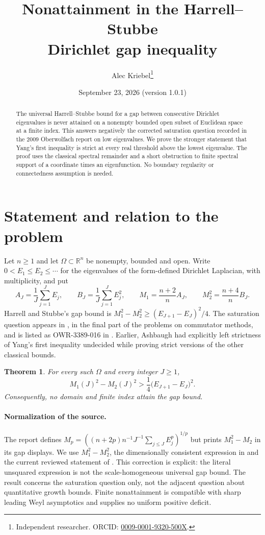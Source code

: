 \documentclass[10pt]{article}
\title{Nonattainment in the Harrell--Stubbe\protect\\ Dirichlet gap inequality}
\author{Alec Kriebel\thanks{Independent researcher. ORCID: \href{https://orcid.org/0009-0001-9320-500X}{0009-0001-9320-500X}.}}
\date{September 23, 2026 (version 1.0.1)}
\newtheorem{theorem}{Theorem}
\newcommand{\R}{\mathbb R}
\begin{document}
\maketitle
\begin{abstract}
The universal Harrell--Stubbe bound for a gap between consecutive Dirichlet eigenvalues is never attained on a nonempty bounded open subset of Euclidean space at a finite index. This answers negatively the corrected saturation question recorded in the 2009 Oberwolfach report on low eigenvalues. We prove the stronger statement that Yang's first inequality is strict at every real threshold above the lowest eigenvalue. The proof uses the classical spectral remainder and a short obstruction to finite spectral support of a coordinate times an eigenfunction. No boundary regularity or connectedness assumption is needed.
\end{abstract}

\section{Statement and relation to the problem}
Let $n\ge1$ and let $\Omega\subset\R^n$ be nonempty, bounded and open. Write
$0<E_1\le E_2\le\cdots$ for the eigenvalues of the form-defined Dirichlet Laplacian, with multiplicity, and put
\[
 A_J=\frac1J\sum_{j=1}^J E_j,\qquad
 B_J=\frac1J\sum_{j=1}^J E_j^2,\qquad
 M_1=\frac{n+2}{n}A_J,\qquad M_2^2=\frac{n+4}{n}B_J.
\]
Harrell and Stubbe's gap bound \cite[Proposition 6]{HS} is
$M_1^2-M_2^2\ge (E_{J+1}-E_J)^2/4$. The saturation question appears in \cite[p.~415]{OWR}, in the final part of the problems on commutator methods, and is listed as OWR-3389-016 in \cite{UM}. Earlier, Ashbaugh \cite[p.~12]{Ash02} had explicitly left strictness of Yang's first inequality undecided while proving strict versions of the other classical bounds.

\begin{theorem}\label{thm:gap}
For every such $\Omega$ and every integer $J\ge1$,
\begin{equation}\label{eq:gap}
 \boxed{\quad M_1(J)^2-M_2(J)^2>
 \frac14\bigl(E_{J+1}-E_J\bigr)^2.\quad}
\end{equation}
Consequently, no domain and finite index attain the gap bound.
\end{theorem}

\paragraph{Normalization of the source.}
The report \cite[p.~415]{OWR} defines
$M_p=((n+2p)n^{-1}J^{-1}\sum_{j\le J}E_j^p)^{1/p}$ but prints
$M_1^2-M_2$ in its gap displays. We use $M_1^2-M_2^2$, the dimensionally consistent expression in \cite[Proposition 6]{HS} and the current reviewed statement of \cite{UM}. This correction is explicit: the literal unsquared expression is not the scale-homogeneous universal gap bound. The result concerns the saturation question only, not the adjacent question about quantitative growth bounds. Finite nonattainment is compatible with sharp leading Weyl asymptotics and supplies no uniform positive deficit.
\end{document}
